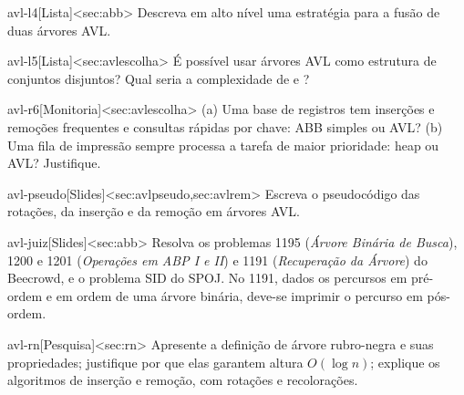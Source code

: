 \begin{exercicio}{avl-l4}[Lista]<sec:abb>
Descreva em alto nível uma estratégia para a fusão de duas árvores AVL.
\end{exercicio}
\begin{exercicio}{avl-l5}[Lista]<sec:avlescolha>
É possível usar árvores AVL como estrutura de conjuntos disjuntos? Qual seria a complexidade de \Find{} e \Union?
\end{exercicio}
\begin{exercicio}{avl-r6}[Monitoria]<sec:avlescolha>
(a) Uma base de registros tem inserções e remoções frequentes e consultas rápidas por chave: ABB simples ou AVL? (b) Uma fila de impressão sempre processa a tarefa de maior prioridade: heap ou AVL? Justifique.
\end{exercicio}
\begin{exercicio}{avl-pseudo}[Slides]<sec:avlpseudo,sec:avlrem>
Escreva o pseudocódigo das rotações, da inserção e da remoção em árvores AVL.
\end{exercicio}
\begin{exercicio}{avl-juiz}[Slides]<sec:abb>
Resolva os problemas 1195 (\emph{Árvore Binária de Busca}), 1200 e 1201 (\emph{Operações em ABP I e II}) e 1191 (\emph{Recuperação da Árvore}) do Beecrowd, e o problema SID do SPOJ. No 1191, dados os percursos em pré-ordem e em ordem de uma árvore binária, deve-se imprimir o percurso em pós-ordem.
\end{exercicio}
\begin{exercicio}{avl-rn}[Pesquisa]<sec:rn>
Apresente a definição de árvore rubro-negra e suas propriedades; justifique por que elas garantem altura $O(\log n)$; explique os algoritmos de inserção e remoção, com rotações e recolorações.
\end{exercicio}

